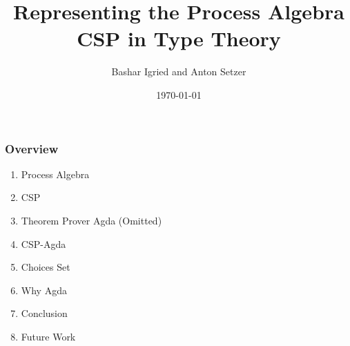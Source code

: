 \documentclass{beamer}
\title[Representing the Process Algebra CSP in Type
Theory]{Representing the Process Algebra CSP in Type
Theory} %
\author{Bashar Igried and Anton Setzer} %
\institute[Swansea University] %
{
Swansea University, Swansea,Wales, UK \\ %
\medskip
\textit{bashar.igried@yahoo.com , a.g.setzer@swansea.ac.uk} %
}
\date{\today} %
\begin{document}



\begin{frame}
\titlepage
\end{frame}








\begin{frame}
\frametitle{Overview}
\begin{enumerate}


\item Process Algebra 
\item CSP
\item Theorem Prover Agda (Omitted) 
\item CSP-Agda
\item Choices Set 
\item Why Agda
\item Conclusion
\item Future Work 


\end{enumerate}
\end{frame}









%
%
%
%
%
%
%
%
\end{document}
